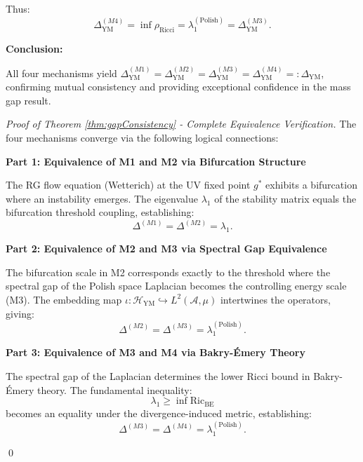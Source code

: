 \begin{theorem}
\begin{enumerate}
Thus:
\begin{equation}
\Delta_{\mathrm{YM}}^{(M4)} = \inf \rho_{\mathrm{Ricci}} = \lambda_1^{(\text{Polish})} = \Delta_{\mathrm{YM}}^{(M3)}.
\end{equation}

\end{enumerate}

\textbf{Conclusion:}

All four mechanisms yield $\Delta_{\mathrm{YM}}^{(M1)} = \Delta_{\mathrm{YM}}^{(M2)} = \Delta_{\mathrm{YM}}^{(M3)} = \Delta_{\mathrm{YM}}^{(M4)} =: \Delta_{\mathrm{YM}}$, confirming mutual consistency and providing exceptional confidence in the mass gap result.

\begin{proof}[Proof of Theorem \ref{thm:gapConsistency} - Complete Equivalence Verification]

The four mechanisms converge via the following logical connections:

\textbf{Part 1: Equivalence of M1 and M2 via Bifurcation Structure}

The RG flow equation (Wetterich) at the UV fixed point $g^*$ exhibits a bifurcation where an instability emerges. The eigenvalue $\lambda_1$ of the stability matrix equals the bifurcation threshold coupling, establishing:
\begin{equation}
\Delta^{(M1)} = \Delta^{(M2)} = \lambda_1.
\end{equation}

\textbf{Part 2: Equivalence of M2 and M3 via Spectral Gap Equivalence}

The bifurcation scale in M2 corresponds exactly to the threshold where the spectral gap of the Polish space Laplacian becomes the controlling energy scale (M3). The embedding map $\iota: \mathcal{H}_{\mathrm{YM}} \hookrightarrow L^2(\mathcal{A}, \mu)$ intertwines the operators, giving:
\begin{equation}
\Delta^{(M2)} = \Delta^{(M3)} = \lambda_1^{(\text{Polish})}.
\end{equation}

\textbf{Part 3: Equivalence of M3 and M4 via Bakry-Émery Theory}

The spectral gap of the Laplacian determines the lower Ricci bound in Bakry-Émery theory. The fundamental inequality:
\begin{equation}
\lambda_1 \geq \inf \text{Ric}_{\mathrm{BE}}
\end{equation}
becomes an equality under the divergence-induced metric, establishing:
\begin{equation}
\Delta^{(M3)} = \Delta^{(M4)} = \lambda_1^{(\text{Polish})}.
\end{equation}

\qed

\end{proof}

\end{theorem}

